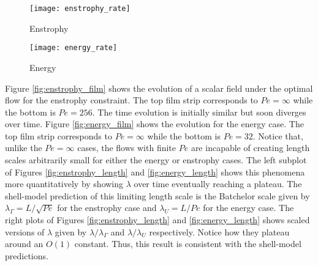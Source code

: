 \documentclass{jfm}
\begin{document}
\begin{figure}
\centering
\texttt{[image: enstrophy\_rate]}
\caption{Enstrophy}
\label{fig:enstrophy_rate}
\end{figure}



\begin{figure}
\centering
\texttt{[image: energy\_rate]}
\caption{Energy}
\label{fig:energy_rate}
\end{figure}



 Figure \ref{fig:enstrophy_film} shows the evolution of a scalar field under the optimal flow for the enstrophy constraint. The top film strip corresponds to $Pe =\infty$ while the bottom is $Pe = 256$. The time evolution is initially similar but soon diverges over time. Figure \ref{fig:energy_film} shows the evolution for the energy case. The top film strip corresponds to $Pe =\infty$ while the bottom is $Pe = 32$. Notice that, unlike the $Pe = \infty$ cases, the flows with finite $Pe$ are incapable of creating length scales arbitrarily small for either the energy or enstrophy cases.  The left subplot of Figures \ref{fig:enstrophy_length} and \ref{fig:energy_length} shows this phenomena more quantitatively by showing $\lambda$ over time eventually reaching a plateau. The shell-model prediction of this limiting length scale is the Batchelor scale given by $\lambda_{\Gamma} = L/\sqrt{Pe}$ for the enstrophy case and  $\lambda_{U} = L/Pe$ for the energy case. The right plots of Figures \ref{fig:enstrophy_length} and \ref{fig:energy_length} shows scaled versions of $\lambda$ given by  $\lambda/\lambda_{\Gamma}$ and $\lambda/\lambda_{U}$ respectively.  Notice how they plateau around an $O(1)$ constant. Thus, this result is consistent with the shell-model predictions. 
 
\end{document}
